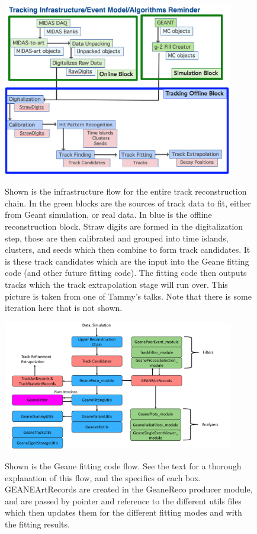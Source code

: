 \documentclass{article}
\begin{document}
\begin{figure}[]
\caption{Shown is the infrastructure flow for the entire track reconstruction chain. In the green blocks are the sources of track data to fit, either from Geant simulation, or real data. In blue is the offline reconstruction block. Straw digits are formed in the digitalization step, those are then calibrated and grouped into time islands, clusters, and seeds which then combine to form track candidates. It is these track candidates which are the input into the Geane fitting code (and other future fitting code). The fitting code then outputs tracks which the track extrapolation stage will run over. This picture is taken from one of Tammy's talks. Note that there is some iteration here that is not shown.}
\centering
\includegraphics[width=0.9\textwidth]{TrackInfrastructure}
\label{fig:Infrastructure}
\end{figure}

\begin{figure}[]
\caption{Shown is the Geane fitting code flow. See the text for a thorough explanation of this flow, and the specifics of each box. GEANEArtRecords are created in the GeaneReco producer module, and are passed by pointer and reference to the different utils files which then updates them for the different fitting modes and with the fitting results.}
\centering
\hspace{15mm}
\includegraphics[width=0.9\textwidth]{NewGeaneFlow}
\label{fig:NewGeaneFlow}
\end{figure}
\end{document}
